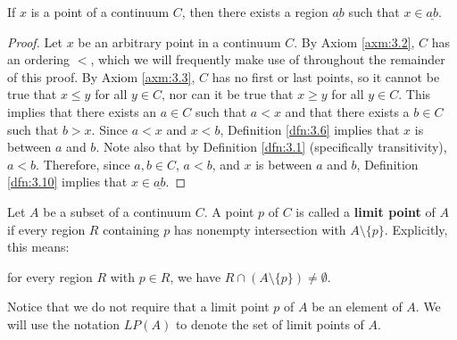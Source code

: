\documentclass[../main.tex]{subfiles}
\begin{document}
\begin{theorem}\label{trm:3.12}
    If $x$ is a point of a continuum $C$, then there exists a region $\underline{ab}$ such that $x\in\underline{ab}$.
    \begin{proof}
        Let $x$ be an arbitrary point in a continuum $C$. By Axiom \ref{axm:3.2}, $C$ has an ordering $<$, which we will frequently make use of throughout the remainder of this proof. By Axiom \ref{axm:3.3}, $C$ has no first or last points, so it cannot be true that $x\leq y$ for all $y\in C$, nor can it be true that $x\geq y$ for all $y\in C$. This implies that there exists an $a\in C$ such that $a<x$ and that there exists a $b\in C$ such that $b>x$. Since $a<x$ and $x<b$, Definition \ref{dfn:3.6} implies that $x$ is between $a$ and $b$. Note also that by Definition \ref{dfn:3.1} (specifically transitivity), $a<b$. Therefore, since $a,b\in C$, $a<b$, and $x$ is between $a$ and $b$, Definition \ref{dfn:3.10} implies that $x\in\underline{ab}$.
    \end{proof}
\end{theorem}

\begin{definition}\label{dfn:3.13}
    Let $A$ be a subset of a continuum $C$. A point $p$ of $C$ is called a \textbf{limit point} of $A$ if every region $R$ containing $p$ has nonempty intersection with $A\setminus\{p\}$. Explicitly, this means:
    \begin{center}
        for every region $R$ with $p\in R$, we have $R\cap(A\setminus\{p\})\neq\emptyset$.
    \end{center}
    Notice that we do not require that a limit point $p$ of $A$ be an element of $A$. We will use the notation $LP(A)$ to denote the set of limit points of $A$.
\end{definition}
\end{document}
